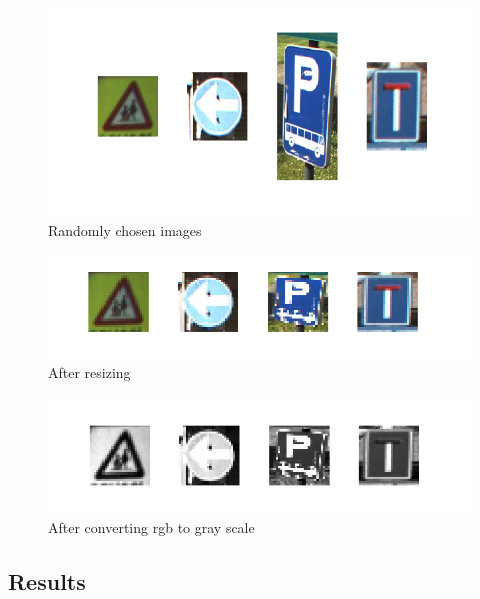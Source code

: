 \documentclass[]{report}
\begin{document}
\begin{figure}[H]
\centerline{\includegraphics[scale=0.9]{random_signs}}
\caption{Randomly chosen images}
\end{figure}
\begin{figure}[H]
\centerline{\includegraphics[scale=0.9]{after_resizing}}
\caption{After resizing}
\end{figure}
\begin{figure}[H]
\centerline{\includegraphics[scale=0.9]{after_gray}}
\caption{After converting rgb to gray scale}
\end{figure}
\subsection{Results}
\end{document}
